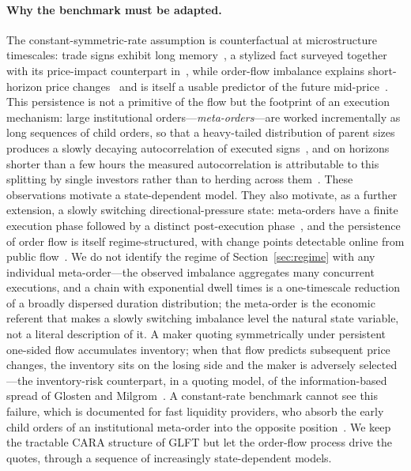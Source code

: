 \documentclass[11pt,a4paper]{article}
\theoremstyle{plain}
\theoremstyle{definition}
\begin{document}
\paragraph{Why the benchmark must be adapted.}
The constant-symmetric-rate assumption is counterfactual at microstructure
timescales: trade signs exhibit long
memory~\cite{LilloFarmer2004,BouchaudGefenPottersWyart2004}, a stylized fact
surveyed together with its price-impact counterpart
in~\cite{BouchaudFarmerLillo2008}, while order-flow imbalance explains
short-horizon price changes~\cite{ContKukanovStoikov2014} and is itself a
usable predictor of the future mid-price~\cite{Stoikov2018}.  This persistence
is not a primitive of the flow but the footprint of an execution mechanism:
large institutional orders---\emph{meta-orders}---are worked incrementally as
long sequences of child orders, so that a heavy-tailed distribution of parent
sizes produces a slowly decaying autocorrelation of executed
signs~\cite{LilloMikeFarmer2005}, and on horizons shorter than a few hours the
measured autocorrelation is attributable to this splitting by single investors
rather than to herding across them~\cite{TothPalitLilloFarmer2015}.  These
observations motivate a state-dependent model.  They also motivate, as a
further extension, a slowly switching directional-pressure state: meta-orders
have a finite execution phase followed by a distinct post-execution
phase~\cite{BacryIugaLasnierLehalle2015}, and the persistence of order flow is
itself regime-structured, with change points detectable online from public
flow~\cite{TsaknakiLilloMazzarisi2025}.  We do not identify the regime of
Section~\ref{sec:regime} with any individual meta-order---the observed
imbalance aggregates many concurrent executions, and a chain with exponential
dwell times is a one-timescale reduction of a broadly dispersed duration
distribution; the meta-order is the economic referent that makes a slowly
switching imbalance level the natural state variable, not a literal
description of it.  A maker quoting symmetrically under persistent
one-sided flow accumulates inventory; when that flow predicts subsequent price
changes, the inventory sits on the losing side and the maker is adversely
selected---the inventory-risk counterpart, in a quoting model, of the
information-based spread of Glosten and Milgrom~\cite{GlostenMilgrom1985}.  A
constant-rate benchmark cannot see this failure, which is documented for fast
liquidity providers, who absorb the early child orders of an institutional
meta-order into the opposite position~\cite{vanKervelMenkveld2019}.  We keep
the tractable CARA structure of GLFT but let the order-flow process drive the
quotes, through a sequence of increasingly state-dependent models.
\end{document}
